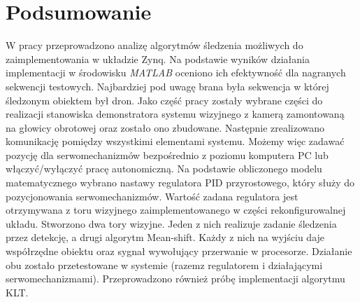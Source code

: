\chapter{Podsumowanie}
\label{cha:podsumowanie}

W pracy przeprowadzono analizę algorytmów śledzenia możliwych do zaimplementowania w układzie Zynq. Na podstawie wyników działania implementacji w środowisku \textit{MATLAB} oceniono ich efektywność dla nagranych sekwencji testowych. Najbardziej pod uwagę brana była sekwencja w której śledzonym obiektem był dron. Jako część pracy zostały wybrane części do realizacji stanowiska demonstratora systemu wizyjnego z kamerą zamontowaną na głowicy obrotowej oraz zostało ono zbudowane. Następnie zrealizowano komunikację pomiędzy wszystkimi elementami systemu. Możemy więc zadawać pozycję dla serwomechanizmów bezpośrednio z poziomu komputera PC lub włączyć/wyłączyć pracę autonomiczną. Na podstawie obliczonego modelu matematycznego wybrano nastawy regulatora PID przyrostowego, który służy do pozycjonowania serwomechanizmów. Wartość zadana regulatora jest otrzymywana z toru wizyjnego zaimplementowanego w części rekonfigurowalnej układu. Stworzono dwa tory wizyjne. Jeden z nich realizuje zadanie śledzenia przez detekcję, a drugi algorytm Mean-shift. Każdy z nich na wyjściu daje współrzędne obiektu oraz sygnał wywołujący przerwanie w procesorze. Działanie obu zostało przetestowane w systemie (razemz regulatorem i działającymi serwomechanizmami). Przeprowadzono również próbę implementacji algorytmu KLT.

